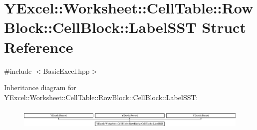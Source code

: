 \hypertarget{struct_y_excel_1_1_worksheet_1_1_cell_table_1_1_row_block_1_1_cell_block_1_1_label_s_s_t}{}\section{Y\+Excel\+:\+:Worksheet\+:\+:Cell\+Table\+:\+:Row\+Block\+:\+:Cell\+Block\+:\+:Label\+S\+S\+T Struct Reference}
\label{struct_y_excel_1_1_worksheet_1_1_cell_table_1_1_row_block_1_1_cell_block_1_1_label_s_s_t}


{\ttfamily \#include $<$Basic\+Excel.\+hpp$>$}

Inheritance diagram for Y\+Excel\+:\+:Worksheet\+:\+:Cell\+Table\+:\+:Row\+Block\+:\+:Cell\+Block\+:\+:Label\+S\+S\+T\+:\begin{figure}[H]
\begin{center}
\leavevmode
\includegraphics[height=1.025641cm]{struct_y_excel_1_1_worksheet_1_1_cell_table_1_1_row_block_1_1_cell_block_1_1_label_s_s_t}
\end{center}
\end{figure}
